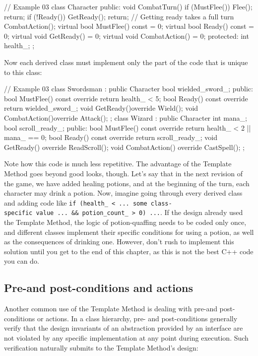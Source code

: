 \begin{code}
// Example 03
class Character {
  public:
  void CombatTurn() {
    if (MustFlee()) {
      Flee();
      return;
    }
    if (!Ready()) {
      GetReady();
      return; // Getting ready takes a full turn
    }
    CombatAction();
  }
  virtual bool MustFlee() const = 0;
  virtual bool Ready() const = 0;
  virtual void GetReady() = 0;
  virtual void CombatAction() = 0;
  protected:
  int health_;
};
\end{code}

Now each derived class must implement only the part of the code that is unique to this class:

\begin{code}
// Example 03
class Swordsman : public Character {
  bool wielded_sword_;
  public:
  bool MustFlee() const override { return health_ < 5; }
  bool Ready() const override { return wielded_sword_; }
  void GetReady()override { Wield(); }
  void CombatAction()override { Attack(); }
};
class Wizard : public Character {
  int mana_;
  bool scroll_ready_;
  public:
  bool MustFlee() const override { return health_ < 2 ||
                                          mana_ == 0; }
  bool Ready() const override { return scroll_ready_; }
  void GetReady() override { ReadScroll(); }
  void CombatAction() override { CastSpell(); }
};
\end{code}

Note how this code is much less repetitive. The advantage of the Template Method goes beyond good looks, though. Let's say that in the next revision of the game, we have added healing potions, and at the beginning of the turn, each character may drink a potion. Now, imagine going through every derived class and adding code like \texttt{if\ (health\_\ \textless{}\ ...\ some\ class-specific\ value\ ...\ \&\&\ potion\_count\_\ \textgreater{}\ 0)\ ...}. If the design already used the Template Method, the logic of potion-quaffing needs to be coded only once, and different classes implement their specific conditions for using a potion, as well as the consequences of drinking one. However, don't rush to implement this solution until you get to the end of this chapter, as this is not the best C++ code you can do.

\subsection{Pre-and post-conditions and actions}

Another common use of the Template Method is dealing with pre-and post-conditions or actions. In a class hierarchy, pre- and post-conditions generally verify that the design invariants of an abstraction provided by an interface are not violated by any specific implementation at any point during execution. Such verification naturally submits to the Template Method's design:

